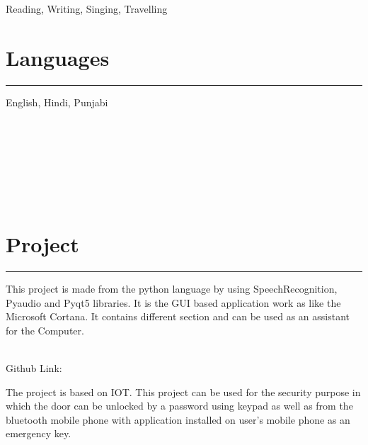 \documentclass[]{vishal-kathpalia}
\begin{document}
\begin{minipage}[t]{0.33\textwidth}
Reading, Writing, Singing, Travelling
\section{Languages}
\noindent\rule{5cm}{0.4pt}

English, Hindi, Punjabi
%
%

\end{minipage} 
\hfill
\begin{minipage}[t]{0.66\textwidth} 
\hspace*{0pt}\hfill    \\
\hspace*{0pt}\hfill    \\
\hspace*{0pt}\hfill    \\
\hspace*{0pt}\hfill    \\
\hspace*{0pt}\hfill    \\
\hspace*{0pt}\hfill    \\
\section{Project}
\noindent\rule{12.5cm}{0.4pt}
\datecolor{} 
\noindent
\hspace{0em}%
\begin{minipage}{0.95\textwidth\vspace{2pt}}
This project is made from the python language by using SpeechRecognition, Pyaudio and Pyqt5 libraries. It is the GUI based application work as like the Microsoft Cortana. It contains different section and can be used as an assistant for the Computer.
\end{minipage}
\\ 
Github Link: \href{https://github.com/Er-Vishal-Kathpalia/Speech-Recognition}{}\\

\sectionsep
\datecolor{} 
\noindent
\hspace{0em}%
\begin{minipage}{0.95\textwidth\vspace{2pt}}
The project is based on IOT. This project can be used for the security purpose in which the door can be unlocked by a password using keypad as well as from the bluetooth mobile phone with application installed on user’s mobile phone as an emergency key. 
\end{minipage}
\sectionsep


\end{minipage}
\end{document}
